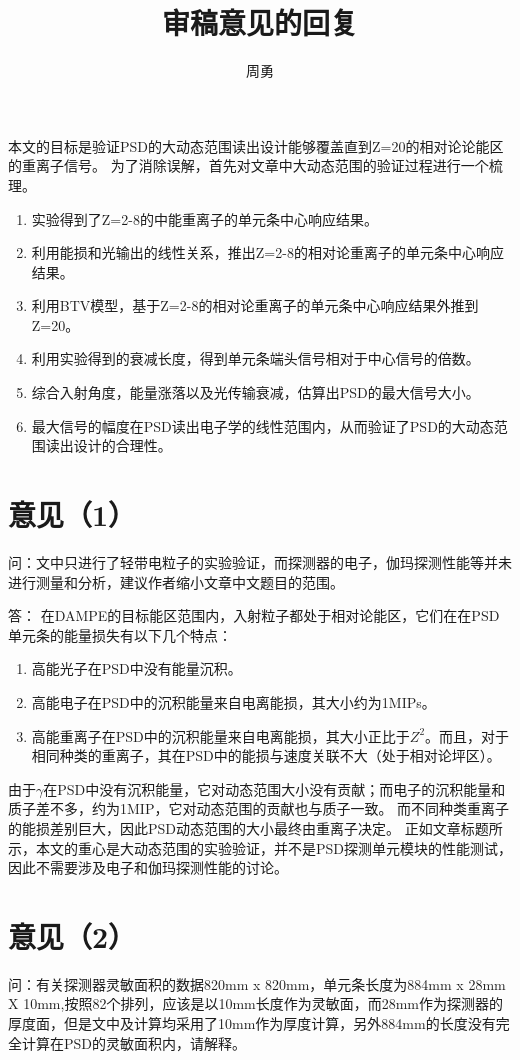 \documentclass[UTF8]{ctexart}
\title{审稿意见的回复}
\author{周勇}
\begin{document}
\maketitle

本文的目标是验证PSD的大动态范围读出设计能够覆盖直到Z=20的相对论论能区的重离子信号。
为了消除误解，首先对文章中大动态范围的验证过程进行一个梳理。
\begin{enumerate}
  \item 实验得到了Z=2-8的中能重离子的单元条中心响应结果。
  \item 利用能损和光输出的线性关系，推出Z=2-8的相对论重离子的单元条中心响应结果。
  \item 利用BTV模型，基于Z=2-8的相对论重离子的单元条中心响应结果外推到Z=20。
  \item 利用实验得到的衰减长度，得到单元条端头信号相对于中心信号的倍数。
  \item 综合入射角度，能量涨落以及光传输衰减，估算出PSD的最大信号大小。
  \item 最大信号的幅度在PSD读出电子学的线性范围内，从而验证了PSD的大动态范围读出设计的合理性。
\end{enumerate}

\section{意见（1）}
问：文中只进行了轻带电粒子的实验验证，而探测器的电子，伽玛探测性能等并未进行测量和分析，建议作者缩小文章中文题目的范围。

答：
在DAMPE的目标能区范围内，入射粒子都处于相对论能区，它们在在PSD单元条的能量损失有以下几个特点：
\begin{enumerate}
 \item 高能光子在PSD中没有能量沉积。
 \item 高能电子在PSD中的沉积能量来自电离能损，其大小约为1MIPs。
 \item 高能重离子在PSD中的沉积能量来自电离能损，其大小正比于$Z^2$。而且，对于相同种类的重离子，其在PSD中的能损与速度关联不大（处于相对论坪区）。
\end{enumerate}
由于$\gamma$在PSD中没有沉积能量，它对动态范围大小没有贡献；而电子的沉积能量和质子差不多，约为1MIP，它对动态范围的贡献也与质子一致。
而不同种类重离子的能损差别巨大，因此PSD动态范围的大小最终由重离子决定。
正如文章标题所示，本文的重心是大动态范围的实验验证，并不是PSD探测单元模块的性能测试，因此不需要涉及电子和伽玛探测性能的讨论。

\section{意见（2）}
问：有关探测器灵敏面积的数据820mm x 820mm，单元条长度为884mm x 28mm X 10mm,按照82个排列，应该是以10mm长度作为灵敏面，而28mm作为探测器的厚度面，但是文中及计算均采用了10mm作为厚度计算，另外884mm的长度没有完全计算在PSD的灵敏面积内，请解释。
\end{document}
